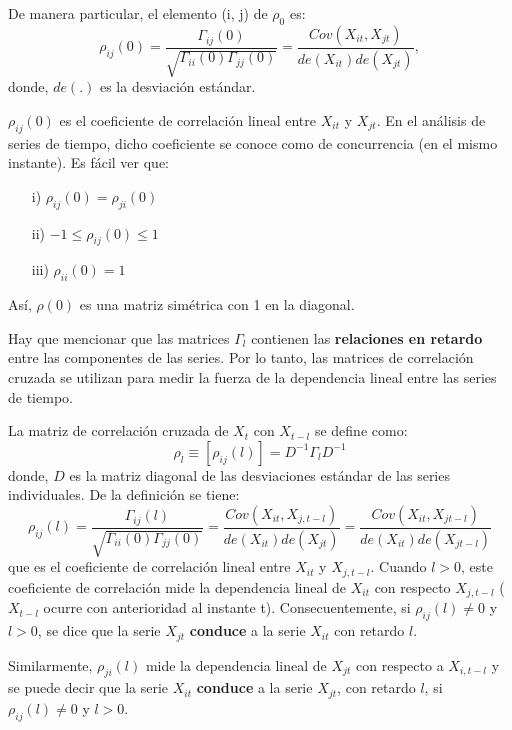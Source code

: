 De manera particular, el elemento (i, j) de $\rho_{0}$ es:
\[
\rho_{ij}(0)=\frac{\Gamma_{ij}(0)}{\sqrt 
{\Gamma_{ii}(0) \Gamma_{jj}(0)}}=\frac{Cov(X_{it}, X_{jt})}{de(X_{it}) de(X_{jt})},
\]
donde, $de\left( . \right)$ es la desviaci\'{o}n est\'{a}ndar.\newline

$\rho_{ij}(0)$ es el coeficiente de correlaci\'{o}n lineal entre $X_{it}$ y $X_{jt}$. En el an\'{a}lisis de series de tiempo, dicho coeficiente se conoce como de concurrencia (en el mismo instante). Es f\'{a}cil ver que:

\begin{enumerate}
\item[i)] $\rho_{ij}\left( 0 \right)=\rho_{ji}\left( 0 \right)$
\item[ii)] $-1\leq \rho_{ij}\left( 0 \right)\leq 1$ 
\item[iii)] $\rho_{ii}\left( 0 \right)=1$
\end{enumerate}

As\'{i}, $\rho \left( 0 \right)$ es una matriz sim\'{e}trica con 1 en la diagonal.\newline

Hay que mencionar que las matrices $\Gamma_{l}$ contienen las \textbf{relaciones en retardo} entre las componentes de las series. Por lo tanto, las matrices de correlaci\'{o}n cruzada se utilizan para medir la fuerza de la dependencia lineal entre las series de tiempo. 

La matriz de correlaci\'{o}n cruzada de $X_{t}$ con $X_{t-l}$ se define como:
\[
\rho_{l}\equiv \left[ \rho_{ij}(l) \right]=D^{-1}\Gamma_{l}D^{-1}
\]
donde, $D$ es la matriz diagonal de las desviaciones est\'{a}ndar de las series individuales. De la definici\'{o}n se tiene:
\[
\rho_{ij}\left( l \right)=\frac{\Gamma_{ij}(l)}{\sqrt{\Gamma_{ii}\left( 0 \right)\Gamma_{jj}(0)}}=\frac{Cov\left(X_{it}, X_{j,t-l} \right)}{de\left(X_{it} \right) de(X_{jt})}=\frac{Cov\left( X_{it},
X_{jt-l} \right)}{de\left(X_{it} \right)de(X_{jt-l})}
\]
que es el coeficiente de correlaci\'{o}n lineal entre $X_{it}$ y $X_{j,t-l}$. Cuando $l>0$, este coeficiente de 
correlaci\'{o}n mide la dependencia lineal de $X_{it}$ con respecto $X_{j,t-l}$ ($X_{t-l}$ ocurre con anterioridad al instante t). Consecuentemente, si $\rho_{ij}\left( l \right)\neq 0$ y $l>0$, se dice que la serie $X_{jt}$ \textbf{conduce} a la serie $X_{it}$ con retardo $l$.\newline

Similarmente, $\rho_{ji}(l)$ mide la dependencia lineal de $X_{jt}$ con respecto a $X_{i,t-l}$ y se puede decir que la serie $X_{it}$ \textbf{conduce} a la serie $X_{jt}$, con retardo $l$, si $\rho_{ij}(l)\neq 0$ y $l>0$.\newline


